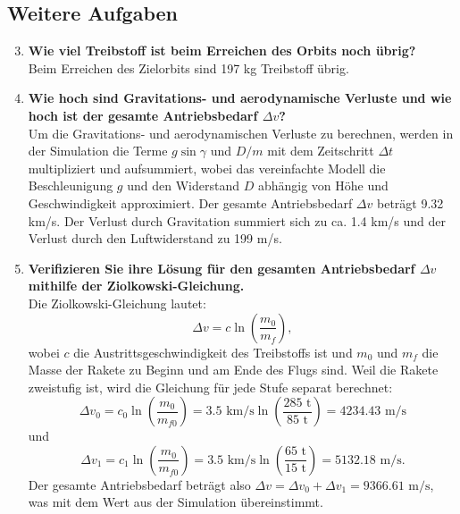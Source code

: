 \documentclass[12pt]{article}
\begin{document}
\subsection{Weitere Aufgaben}
\begin{enumerate}
    \setcounter{enumi}{2}
    \item  \textbf{Wie viel Treibstoff ist beim Erreichen des Orbits noch übrig?} \\
    Beim Erreichen des Zielorbits sind 197 kg Treibstoff übrig.
    \item \textbf{Wie hoch sind Gravitations- und aerodynamische Verluste und wie hoch ist der gesamte Antriebsbedarf $\Delta v$?} \\
    Um die Gravitations- und aerodynamischen Verluste zu berechnen, werden in der Simulation die Terme $g \sin \gamma$ und $D/m$ mit dem Zeitschritt $\Delta t$ multipliziert und aufsummiert, wobei das vereinfachte Modell die Beschleunigung $g$ und den Widerstand $D$ abhängig von Höhe und Geschwindigkeit approximiert. Der gesamte Antriebsbedarf $\Delta v$ beträgt 9.32 km/s. Der Verlust durch Gravitation summiert sich zu ca. 1.4 km/s und der Verlust durch den Luftwiderstand zu 199 m/s.
    \item \textbf{Verifizieren Sie ihre Lösung für den gesamten Antriebsbedarf $\Delta v$ mithilfe der Ziolkowski-Gleichung.} \\
    Die Ziolkowski-Gleichung lautet:
    \begin{equation}
        \Delta v = c \ln \left( \frac{m_0}{m_f} \right),
    \end{equation} 
    wobei $c$ die Austrittsgeschwindigkeit des Treibstoffs ist und $m_0$ und $m_f$ die Masse der Rakete zu Beginn und am Ende des Flugs sind. Weil die Rakete zweistufig ist, wird die Gleichung für jede Stufe separat berechnet:
    \begin{equation}
        \Delta v_0 = c_0 \ln \left( \frac{m_0}{m_{f0}} \right) = 3.5 \text{ km/s} \ln \left( \frac{285 \text{ t}}{85 \text{ t}} \right) = 4234.43 \text{ m/s}
    \end{equation}
    und
    \begin{equation}
        \Delta v_1 = c_1 \ln \left( \frac{m_0}{m_{f0}} \right) = 3.5 \text{ km/s} \ln \left( \frac{65 \text{ t}}{15 \text{ t}} \right) = 5132.18 \text{ m/s}.
    \end{equation}
    Der gesamte Antriebsbedarf beträgt also $\Delta v = \Delta v_0 + \Delta v_1 =  9366.61 \text{ m/s}$, was mit dem Wert aus der Simulation übereinstimmt.


\end{enumerate}
\end{document}
